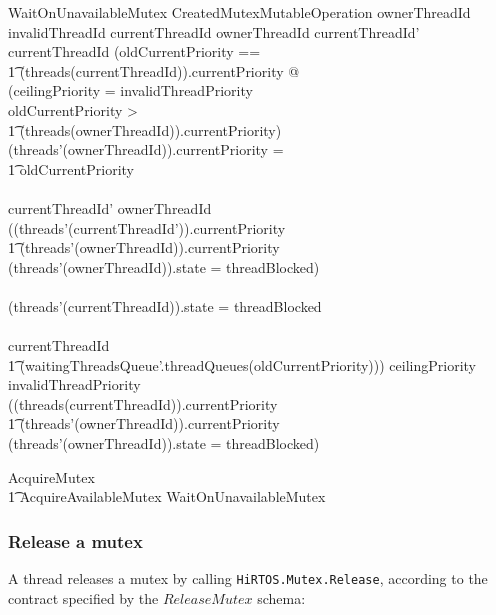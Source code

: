 \documentclass[11pt,letterpaper,twoside,openany]{book}
\begin{document}
\begin{schema}{WaitOnUnavailableMutex}
   CreatedMutexMutableOperation
\where
   ownerThreadId \neq invalidThreadId
\also
   currentThreadId \neq ownerThreadId
\also
   currentThreadId' \neq currentThreadId
\also
(\LET oldCurrentPriority == \\
\t1 (threads(currentThreadId)).currentPriority @ \\
(ceilingPriority = invalidThreadPriority \land \\
 oldCurrentPriority > \\
 \t1 (threads(ownerThreadId)).currentPriority) \implies \\
 (threads'(ownerThreadId)).currentPriority = \\
 \t1 oldCurrentPriority \\
\land \\
 currentThreadId' \neq ownerThreadId \implies \\
 ((threads'(currentThreadId')).currentPriority \geq \\
 \t1 (threads'(ownerThreadId)).currentPriority \lor \\
 (threads'(ownerThreadId)).state = threadBlocked) \\
\land \\
 (threads'(currentThreadId)).state = threadBlocked \\
\land \\
currentThreadId \in \\
\t1 \ran (waitingThreadsQueue'.threadQueues(oldCurrentPriority)))
\also
ceilingPriority \neq invalidThreadPriority \implies \\
((threads(currentThreadId)).currentPriority \leq \\
 \t1 (threads'(ownerThreadId)).currentPriority \land \\
 (threads'(ownerThreadId)).state = threadBlocked)
\end{schema}

\begin{zed}
   AcquireMutex  \\
   \t1 AcquireAvailableMutex \lor WaitOnUnavailableMutex
\end{zed}

\subsubsection{Release a mutex}

A thread releases a mutex by calling \verb`HiRTOS.Mutex.Release`, according to the contract
specified by the $ReleaseMutex$ schema:
\end{document}
